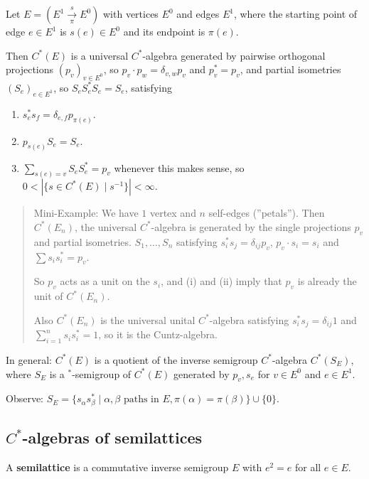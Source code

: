\documentclass[a4paper]{article}
\begin{document}
\begin{example}
	Let $E = (E^1 \xrightarrow[\pi]{s} E^0)$ with vertices $E^0$ and edges $E^1$, where the starting point of edge $e \in E^1$ is $s(e) \in E^0$ and its endpoint is $\pi(e)$.

	Then $C^*(E)$ is a universal $C^*$-algebra generated by pairwise orthogonal projections $(p_v)_{v \in E^0}$, so $p_v \cdot p_w = \delta_{v,w} p_v$ and $p_v^* = p_v$, and partial isometries $(S_e)_{e \in E^1}$, so $S_e S_e^* S_e = S_e$, satisfying
	\begin{enumerate}
		\item $s_e^* s_f = \delta_{e,f} p_{\pi(e)}$.
		\item $p_{s(e)} S_e = S_e$.
		\item $\sum_{s(e) = v} S_e S_e^* = p_v$ whenever this makes sense, so $0 < |\{s \in C^*(E) \mid s^{-1} \}| < \infty$.
	\end{enumerate}

	\begin{quote}
		Mini-Example: We have $1$ vertex and $n$ self-edges (''petals'').
		Then $C^*(E_n)$, the universal $C^*$-algebra is generated by the single projections $p_v$ and partial isometries. $S_1, \dots, S_n$ satisfying $s_i^* s_j = \delta_{ij} p_v$, $p_v \cdot s_i = s_i$ and $\sum s_i s_i^* = p_v$.

		So $p_v$ acts as a unit on the $s_i$, and (i) and (ii) imply that $p_v$ is already the unit of $C^*(E_n)$.

		Also $C^*(E_n)$ is the universal unital $C^*$-algebra satisfying  $s_i^* s_j = \delta_{ij} 1$ and $\sum_{i = 1}^{n} s_i s_i^* = 1$, so it is the Cuntz-algebra.
	\end{quote}

	In general:
	$C^*(E)$ is a quotient of the inverse semigroup $C^*$-algebra $C^*(S_E)$, where $S_E $ is a $^*$-semigroup of $C^*(E)$ generated by $p_v, s_e$ for $v \in E^0$ and $e \in E^1$.

	Observe: $S_E = \{ s_\alpha s_\beta^* \mid \alpha, \beta \text{ paths in } E, \pi(\alpha) = \pi(\beta) \} \cup \{0\} $.
\end{example}

\subsection{$C^*$-algebras of semilattices}

\begin{definition}
	A \textbf{semilattice} is a commutative inverse semigroup $E$ with $e^2 = e$ for all $e \in E$.
\end{definition}
\end{document}
